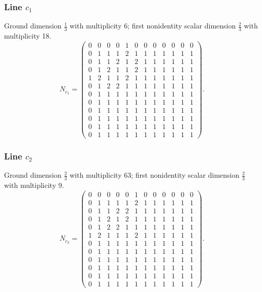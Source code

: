 \subsubsection*{Line $c_{1}$}
\noindent Ground dimension $\frac{1}{3}$ with multiplicity 6; first nonidentity scalar dimension $\frac{2}{3}$ with multiplicity 18.
\[\renewcommand{\arraystretch}{0.93}N_{c_{1}}=\left(\begin{array}{rrrrrrrrrrrr}
0&0&0&0&1&0&0&0&0&0&0&0\\
0&1&1&1&2&1&1&1&1&1&1&1\\
0&1&1&2&1&2&1&1&1&1&1&1\\
0&1&2&1&1&2&1&1&1&1&1&1\\
1&2&1&1&2&1&1&1&1&1&1&1\\
0&1&2&2&1&1&1&1&1&1&1&1\\
0&1&1&1&1&1&1&1&1&1&1&1\\
0&1&1&1&1&1&1&1&1&1&1&1\\
0&1&1&1&1&1&1&1&1&1&1&1\\
0&1&1&1&1&1&1&1&1&1&1&1\\
0&1&1&1&1&1&1&1&1&1&1&1\\
0&1&1&1&1&1&1&1&1&1&1&1
\end{array}\right).\]
\subsubsection*{Line $c_{2}$}
\noindent Ground dimension $\frac{2}{3}$ with multiplicity 63; first nonidentity scalar dimension $\frac{2}{3}$ with multiplicity 9.
\[\renewcommand{\arraystretch}{0.93}N_{c_{2}}=\left(\begin{array}{rrrrrrrrrrrr}
0&0&0&0&0&1&0&0&0&0&0&0\\
0&1&1&1&1&2&1&1&1&1&1&1\\
0&1&1&2&2&1&1&1&1&1&1&1\\
0&1&2&1&2&1&1&1&1&1&1&1\\
0&1&2&2&1&1&1&1&1&1&1&1\\
1&2&1&1&1&2&1&1&1&1&1&1\\
0&1&1&1&1&1&1&1&1&1&1&1\\
0&1&1&1&1&1&1&1&1&1&1&1\\
0&1&1&1&1&1&1&1&1&1&1&1\\
0&1&1&1&1&1&1&1&1&1&1&1\\
0&1&1&1&1&1&1&1&1&1&1&1\\
0&1&1&1&1&1&1&1&1&1&1&1
\end{array}\right).\]
